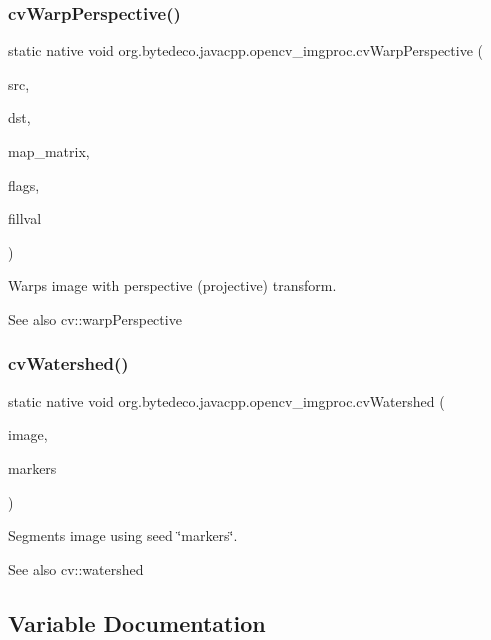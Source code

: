 \subsubsection{\texorpdfstring{cv\+Warp\+Perspective()}{cvWarpPerspective()}}
{\footnotesize\ttfamily static native void org.\+bytedeco.\+javacpp.\+opencv\+\_\+imgproc.\+cv\+Warp\+Perspective (\begin{DoxyParamCaption}\item[{@Const Cv\+Arr}]{src,  }\item[{Cv\+Arr}]{dst,  }\item[{@Const Cv\+Mat}]{map\+\_\+matrix,  }\item[{int}]{flags,  }\item[{@By\+Val(null\+Value=\char`\"{}Cv\+Scalar(cv\+Scalar\+All(0))\char`\"{}) Cv\+Scalar}]{fillval }\end{DoxyParamCaption})\hspace{0.3cm}{\ttfamily [static]}}



Warps image with perspective (projective) transform. 

\begin{DoxySeeAlso}{See also}
cv\+::warp\+Perspective 
\end{DoxySeeAlso}
\mbox{\label{group__imgproc__c_gae7b6a113cdd9df18a224597d7e034810}} 
\subsubsection{\texorpdfstring{cv\+Watershed()}{cvWatershed()}}
{\footnotesize\ttfamily static native void org.\+bytedeco.\+javacpp.\+opencv\+\_\+imgproc.\+cv\+Watershed (\begin{DoxyParamCaption}\item[{@Const Cv\+Arr}]{image,  }\item[{Cv\+Arr}]{markers }\end{DoxyParamCaption})\hspace{0.3cm}{\ttfamily [static]}}



Segments image using seed \char`\"{}markers\char`\"{}. 

\begin{DoxySeeAlso}{See also}
cv\+::watershed 
\end{DoxySeeAlso}


\subsection{Variable Documentation}
\mbox{\label{group__imgproc__c_ga6503a819d73170b078c6d83a7f160393}} 

